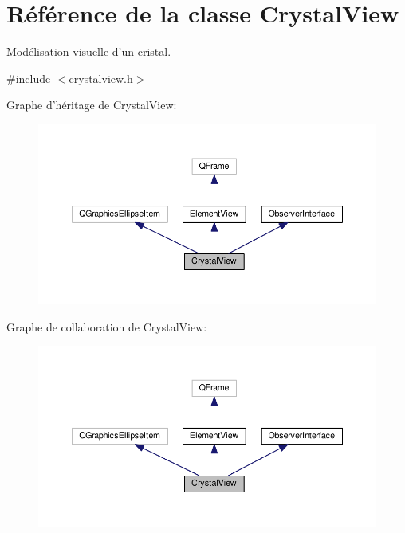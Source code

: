 \hypertarget{classCrystalView}{\section{Référence de la classe Crystal\+View}
\label{classCrystalView}
}


Modélisation visuelle d’un cristal.  




{\ttfamily \#include $<$crystalview.\+h$>$}



Graphe d'héritage de Crystal\+View\+:
\nopagebreak
\begin{figure}[H]
\begin{center}
\leavevmode
\includegraphics[width=350pt]{d8/d3c/classCrystalView__inherit__graph}
\end{center}
\end{figure}


Graphe de collaboration de Crystal\+View\+:
\nopagebreak
\begin{figure}[H]
\begin{center}
\leavevmode
\includegraphics[width=350pt]{d0/d09/classCrystalView__coll__graph}
\end{center}
\end{figure}
